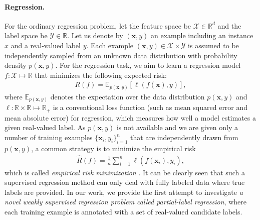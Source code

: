 \documentclass[letterpaper]{article} %
\begin{document}
\paragraph{Regression.} For the ordinary regression problem, let the feature space be $\mathcal{X}\in\mathbb{R}^d$ and the label space be $\mathcal{Y}\in\mathbb{R}$. Let us denote by $(\bm{x},y)$ an example including an instance $x$ and a real-valued label $y$. Each example $(\bm{x},y)\in\mathcal{X}\times\mathcal{Y}$ is assumed to be independently sampled from an unknown data distribution with probability density $p(\bm{x},y)$. For the regression task, we aim to learn a regression model $f:\mathcal{X}\mapsto\mathbb{R}$ that minimizes the following expected risk:
\begin{gather}
\label{expected_regression}
R(f)=\mathbb{E}_{p(\bm{x},y)}[\ell(f(\bm{x}),y)],
\end{gather}
where $\mathbb{E}_{p(\bm{x},y)}$ denotes the expectation over the data distribution $p(\bm{x},y)$ and $\ell:\mathbb{R}\times\mathbb{R}\mapsto\mathbb{R}_+$ is a conventional loss function (such as mean squared error and mean absolute error) for regression, which measures how well a model estimates a given real-valued label. As $p(\boldsymbol{x},y)$ is not available and we are given only a number of training examples $\{\boldsymbol{x}_i,y_i\}_{i=1}^n$ that are independently drawn from $p(\boldsymbol{x},y)$, a common strategy is to minimize the empirical risk
\begin{gather}
\label{empirical_regression}
\widehat{R}(f) = \frac{1}{n}\sum\nolimits_{i=1}^n\ell(f(\boldsymbol{x}_i),y_i),
\end{gather} 
which is called \emph{empirical risk minimization} \cite{vapnik1999overview}. It can be clearly seen that such a supervised regression method can only deal with fully labeled data where true labels are provided. In our work, we provide the first attempt to investigate \emph{a novel weakly supervised regression problem called partial-label regression}, where each training example is annotated with a set of real-valued candidate labels.

\end{document}

